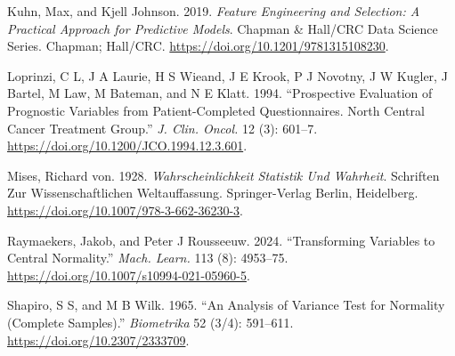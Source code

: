 \documentclass[
  a4paper,
]{article}
\newlength{\cslhangindent}
\newenvironment{CSLReferences}[2] %
 {\begin{list}{}{%
  \setlength{\itemindent}{0pt}
  \setlength{\leftmargin}{0pt}
  \setlength{\parsep}{0pt}
  \ifodd #1
   \setlength{\leftmargin}{\cslhangindent}
   \setlength{\itemindent}{-1\cslhangindent}
  \fi
  \setlength{\itemsep}{#2\baselineskip}}}
 {\end{list}}
\begin{document}
\begin{CSLReferences}{1}{0}
Kuhn, Max, and Kjell Johnson. 2019. \emph{Feature Engineering and
Selection: A Practical Approach for Predictive Models}. Chapman \&
Hall/CRC Data Science Series. Chapman; Hall/CRC.
\url{https://doi.org/10.1201/9781315108230}.

Loprinzi, C L, J A Laurie, H S Wieand, J E Krook, P J Novotny, J W
Kugler, J Bartel, M Law, M Bateman, and N E Klatt. 1994. {``Prospective
Evaluation of Prognostic Variables from Patient-Completed
Questionnaires. North Central Cancer Treatment Group.''} \emph{J. Clin.
Oncol.} 12 (3): 601--7. \url{https://doi.org/10.1200/JCO.1994.12.3.601}.

Mises, Richard von. 1928. \emph{Wahrscheinlichkeit Statistik Und
Wahrheit}. Schriften Zur Wissenschaftlichen Weltauffassung.
Springer-Verlag Berlin, Heidelberg.
\url{https://doi.org/10.1007/978-3-662-36230-3}.

Raymaekers, Jakob, and Peter J Rousseeuw. 2024. {``Transforming
Variables to Central Normality.''} \emph{Mach. Learn.} 113 (8):
4953--75. \url{https://doi.org/10.1007/s10994-021-05960-5}.

Shapiro, S S, and M B Wilk. 1965. {``An Analysis of Variance Test for
Normality (Complete Samples).''} \emph{Biometrika} 52 (3/4): 591--611.
\url{https://doi.org/10.2307/2333709}.

\end{CSLReferences}
\end{document}

